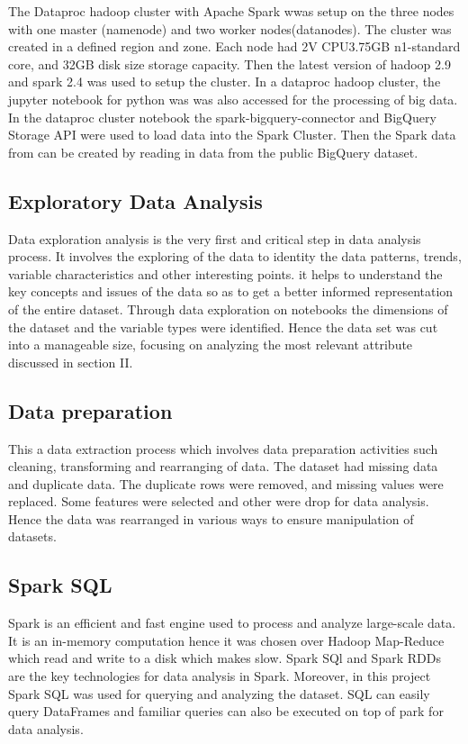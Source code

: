 \documentclass[12pt,letterpaper, twoside]{article}
\begin{document}
The Dataproc hadoop cluster with Apache Spark wwas setup on the three nodes with one master (namenode) and two worker nodes(datanodes). The cluster was created in a defined region and zone. Each node had 2V CPU3.75GB n1-standard core, and 32GB disk size storage capacity. Then the latest version of hadoop 2.9 and spark 2.4 was used to setup the cluster. In a dataproc hadoop cluster, the jupyter notebook for python was was also accessed for the processing of big data.  In the dataproc cluster notebook the spark-bigquery-connector and BigQuery Storage API were used to  load data into the Spark Cluster. Then the Spark data from can be created by reading in data from the public BigQuery dataset. 

\subsection{ Exploratory Data Analysis}
Data exploration analysis is the very first and critical step in data analysis process. It involves the exploring of the data to identity the data patterns, trends, variable characteristics and other interesting points. it helps to understand the key concepts and issues of the data so as to get a better informed representation of the entire dataset. Through data exploration on notebooks the dimensions of the dataset and the variable types were identified. Hence the data set was cut into a manageable size, focusing on analyzing the most relevant attribute discussed in section II. 

\subsection{Data preparation}
 This a data extraction process which involves data preparation activities such cleaning, transforming and rearranging of data. The dataset had missing data and duplicate data. The duplicate rows were removed, and missing values were replaced. Some features were selected and other were drop for data analysis. Hence the data was rearranged in various ways to ensure  manipulation of datasets. 


\subsection{Spark SQL}
Spark is an efficient and fast engine used to process and analyze large-scale data. It is an in-memory computation hence it was chosen over Hadoop Map-Reduce which read  and write to a disk which makes slow. Spark SQl and Spark RDDs are the key technologies for data analysis in Spark. Moreover, in this project Spark SQL was used for querying  and analyzing the dataset. SQL can easily  query DataFrames and familiar queries can also be executed on top of park for data analysis.
\end{document}
